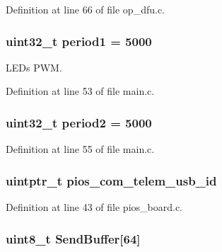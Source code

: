 \-Definition at line 66 of file op\-\_\-dfu.\-c.

\hypertarget{group___discovery_f4_b_l_gabe751b3d399e053031c1e3db20b6b071}{
\subsubsection[{period1}]{\setlength{\rightskip}{0pt plus 5cm}uint32\-\_\-t {\bf period1} = 5000}}\label{group___discovery_f4_b_l_gabe751b3d399e053031c1e3db20b6b071}


\-L\-E\-Ds \-P\-W\-M. 



\-Definition at line 53 of file main.\-c.

\hypertarget{group___discovery_f4_b_l_gadf8633b43922fbf4f1d86981daf74ccc}{
\subsubsection[{period2}]{\setlength{\rightskip}{0pt plus 5cm}uint32\-\_\-t {\bf period2} = 5000}}\label{group___discovery_f4_b_l_gadf8633b43922fbf4f1d86981daf74ccc}


\-Definition at line 55 of file main.\-c.

\hypertarget{group___discovery_f4_b_l_ga513cc36d72b76de2fcb75ff233a79a4a}{
\subsubsection[{pios\-\_\-com\-\_\-telem\-\_\-usb\-\_\-id}]{\setlength{\rightskip}{0pt plus 5cm}uintptr\-\_\-t {\bf pios\-\_\-com\-\_\-telem\-\_\-usb\-\_\-id}}}\label{group___discovery_f4_b_l_ga513cc36d72b76de2fcb75ff233a79a4a}


\-Definition at line 43 of file pios\-\_\-board.\-c.

\hypertarget{group___discovery_f4_b_l_ga8f7836468d53f1bf54ab28474ae14624}{
\subsubsection[{\-Send\-Buffer}]{\setlength{\rightskip}{0pt plus 5cm}uint8\-\_\-t {\bf \-Send\-Buffer}\mbox{[}64\mbox{]}}}\label{group___discovery_f4_b_l_ga8f7836468d53f1bf54ab28474ae14624}


